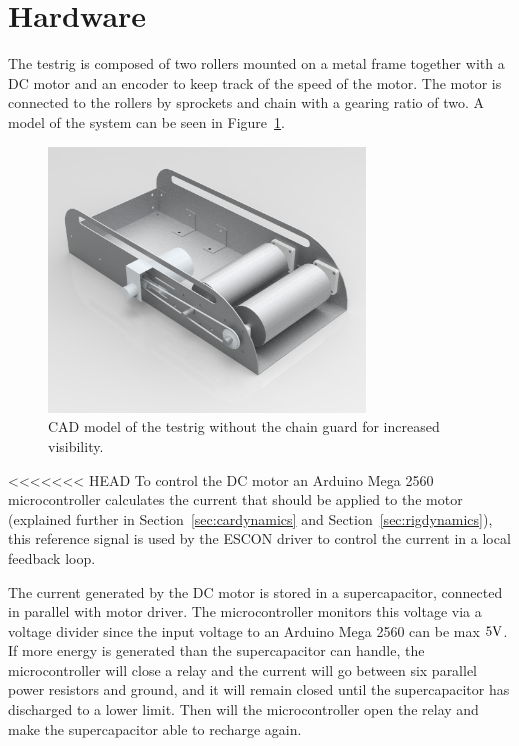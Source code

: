 \section{Hardware}\label{sec:testrig_hardware}
The testrig is composed of two rollers mounted on a metal frame together with a DC motor
and an encoder to keep track of the speed of the motor. The motor is connected to the
rollers by sprockets and chain with a gearing ratio of two. A model of the system can be
seen in Figure~\ref{fig:testrig_hardware}.
\begin{figure}[H]
    \centering
    \includegraphics[width=0.75\textwidth]{./img/testrig_hardware.png}
    \caption{CAD model of the testrig without the chain guard for increased visibility.}
    \label{fig:testrig_hardware}
\end{figure}
<<<<<<< HEAD
To control the DC motor an Arduino Mega 2560 microcontroller calculates the current that
should be applied to the motor (explained further in Section~\ref{sec:cardynamics} and
Section~\ref{sec:rigdynamics}), this reference signal is used by the ESCON driver to control the
current in a local feedback loop.

The current generated by the DC motor is stored in a supercapacitor, connected in parallel
with motor driver. The microcontroller monitors this voltage via a voltage divider since
the input voltage to an Arduino Mega 2560 can be max $5\textnormal{V}$. If more energy is
generated than the supercapacitor can handle, the microcontroller will close a relay and
the current will go between six parallel power resistors and ground, and it will remain
closed until the supercapacitor has discharged to a lower limit. Then will the
microcontroller open the relay and make the supercapacitor able to recharge again.

